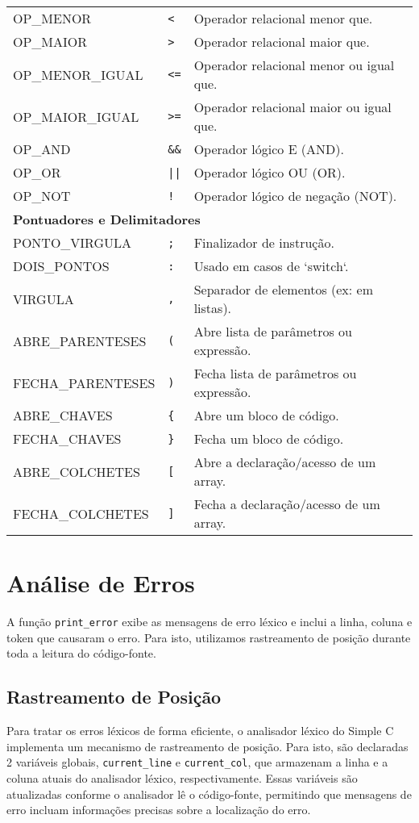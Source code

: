 \documentclass[12pt,a4paper]{article}
\begin{document}
\begin{longtable}{lll}
OP\_MENOR & \texttt{<} & Operador relacional menor que. \\
OP\_MAIOR & \texttt{>} & Operador relacional maior que. \\
OP\_MENOR\_IGUAL & \texttt{<=} & Operador relacional menor ou igual que. \\
OP\_MAIOR\_IGUAL & \texttt{>=} & Operador relacional maior ou igual que. \\
OP\_AND & \texttt{\&\&} & Operador lógico E (AND). \\
OP\_OR & \texttt{||} & Operador lógico OU (OR). \\
OP\_NOT & \texttt{!} & Operador lógico de negação (NOT). \\
\midrule
\multicolumn{3}{l}{\textbf{Pontuadores e Delimitadores}} \\
\midrule
PONTO\_VIRGULA & \texttt{;} & Finalizador de instrução. \\
DOIS\_PONTOS & \texttt{:} & Usado em casos de `switch`. \\
VIRGULA & \texttt{,} & Separador de elementos (ex: em listas). \\
ABRE\_PARENTESES & \texttt{(} & Abre lista de parâmetros ou expressão. \\
FECHA\_PARENTESES & \texttt{)} & Fecha lista de parâmetros ou expressão. \\
ABRE\_CHAVES & \texttt{\{} & Abre um bloco de código. \\
FECHA\_CHAVES & \texttt{\}} & Fecha um bloco de código. \\
ABRE\_COLCHETES & \texttt{[} & Abre a declaração/acesso de um array. \\
FECHA\_COLCHETES & \texttt{]} & Fecha a declaração/acesso de um array. \\
\end{longtable}

\section{Análise de Erros}

A função \texttt{print\_error} exibe as mensagens de erro léxico e inclui a linha, coluna e token que causaram o erro. Para isto, utilizamos rastreamento de posição durante toda a leitura do código-fonte.

\subsection{Rastreamento de Posição}

Para tratar os erros léxicos de forma eficiente, o analisador léxico do Simple C implementa um mecanismo de rastreamento de posição. Para isto, são declaradas 2 variáveis globais, \texttt{current\_line} e \texttt{current\_col}, que armazenam a linha e a coluna atuais do analisador léxico, respectivamente. Essas variáveis são atualizadas conforme o analisador lê o código-fonte, permitindo que mensagens de erro incluam informações precisas sobre a localização do erro.
\end{document}
